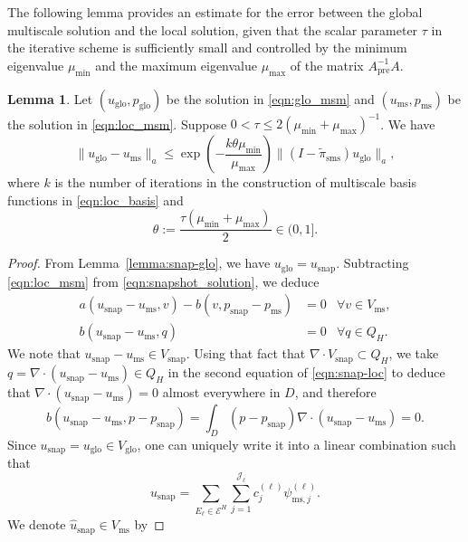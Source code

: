 \documentclass{article}[11pt]
\theoremstyle{definition}
\newtheorem{lemma}{Lemma}[section]
\begin{document}
The following lemma provides an estimate 
for the error between the global multiscale solution 
and the local solution, 
given that the scalar parameter $\tau$ in the iterative scheme 
is sufficiently small and controlled by 
the minimum eigenvalue $\mu_{\text{min}}$ and 
the maximum eigenvalue $\mu_{\text{max}}$ 
of the matrix $A_{\text{pre}}^{-1} A$. 
\begin{lemma}\label{lemma:glo-loc}
Let $(u_{\text{glo}},p_{\text{glo}})$ be the solution in \eqref{eqn:glo_msm} and 
$(u_{\text{ms}},p_{\text{ms}})$ be the solution in \eqref{eqn:loc_msm}. 
Suppose $0< \tau \leq 2(\mu_{\text{min}}+\mu_{\text{max}})^{-1}$.
We have
\begin{equation}
\| u_{\text{glo}} - u_{\text{ms}} \|_a \leq  \exp\left(- \dfrac{k \theta \mu_{\text{min}}}{\mu_{\text{max}}}\right) \| (I - \tilde{\pi}_{\text{sms}}) u_{\text{glo}} \|_a,
\end{equation}
where $k$ is the number of iterations in the construction of multiscale basis functions in \eqref{eqn:loc_basis} and $$\theta := \displaystyle{\frac{\tau (\mu_{\text{min}}+\mu_{\text{max}})}{2}} \in (0,1].$$ 
\begin{proof}
From Lemma~\ref{lemma:snap-glo}, we have $u_{\text{glo}} = u_{\text{snap}}$. 
Subtracting \eqref{eqn:loc_msm} from \eqref{eqn:snapshot_solution}, we deduce 
\begin{equation}
\label{eqn:snap-loc}
\begin{aligned}
a(u_{\text{snap}}-u_{\text{ms}},v) -b(v,p_{\text{snap}}-p_{\text{ms}}) & = 0 & \forall v\in V_{\text{ms}}, \\
b(u_{\text{snap}}-u_{\text{ms}},q) & =0 & \forall q\in Q_{H}.
\end{aligned}
\end{equation}
We note that $u_{\text{snap}}-u_{\text{ms}} \in V_{\text{snap}}$. 
Using that fact that $\nabla \cdot V_{\text{snap}} \subset Q_H$, we take 
$q = \nabla \cdot (u_{\text{snap}}-u_{\text{ms}}) \in Q_H$ 
in the second equation of \eqref{eqn:snap-loc} to deduce that 
$\nabla \cdot \left(u_{\text{snap}}-u_{\text{ms}}\right)= 0$ almost everywhere in $D$, 
and therefore 
\[
b(u_{\text{snap}}-u_{\text{ms}}, p - p_{\text{snap}}) 
= \int_{D} (p - p_{\text{snap}}) \nabla \cdot \left(u_{\text{snap}}-u_{\text{ms}}\right) = 0.
\]
Since $u_{\text{snap}} = u_{\text{glo}} \in V_{\text{glo}}$, one can uniquely write it into a linear combination such that 
\[
u_{\text{snap}} = 
\sum_{E_\ell \in \mathcal{E}^H} \sum_{j=1}^{\mathcal{J}_\ell} 
c_{j}^{(\ell)} \psi_{\text{ms},j}^{(\ell)}.
\]
We denote $\hat{u}_{\text{snap}} \in V_{\text{ms}}$ by 

\end{proof}
\end{lemma}
\end{document}
